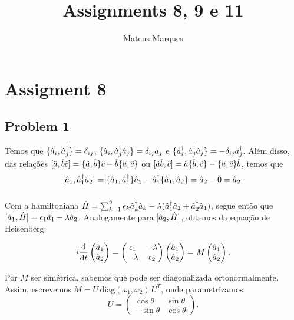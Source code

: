 \documentclass[a4paper,fleqn,12pt]{article}
\title{\Huge{\textbf{Assignments 8, 9 e 11}}}
\author{Mateus Marques}
\begin{document}
\maketitle

\section{Assigment 8}

\subsection{Problem 1}

Temos que $\{ \hat{a}_i, \hat{a}_j^\dagger \} = \delta_{ij}$, $\{\hat{a}_i, \hat{a}_j^\dagger \hat{a}_j \} = \delta_{ij} a_j$ e $\{ \hat{a}_i^\dagger, \hat{a}_j^\dagger \hat{a}_j \} = - \delta_{ij} \hat{a}^\dagger_j$. Além disso, das relações $[\hat{a}, \hat{b} \hat{c}] = \{\hat{a}, \hat{b}\} \hat{c} - \hat{b} \{\hat{a}, \hat{c}\}$ ou $[\hat{a} \hat{b}, \hat{c}] = \hat{a} \{\hat{b}, \hat{c}\} - \{\hat{a}, \hat{c}\} \hat{b}$, temos que
$$
[\hat{a}_1, \hat{a}_1^\dagger \hat{a}_2] = \{\hat{a}_1, \hat{a}_1^\dagger\} \hat{a}_2 - \hat{a}_1^\dagger \{\hat{a}_1, \hat{a}_2\} = \hat{a}_2 - 0 = \hat{a}_2.
$$

\subsubsection{}

Com a hamiltoniana $\hat{H} = \sum_{k=1}^2 \epsilon_k \hat{a}^\dagger_k \hat{a}_k - \lambda(\hat{a}_1^\dagger \hat{a}_2 + \hat{a}_2^\dagger \hat{a}_1)$, segue então que $[\hat{a}_1, \hat{H}] = \epsilon_1 \hat{a}_1 - \lambda \hat{a}_2$. Analogamente para $[\hat{a}_2, \hat{H}]$, obtemos da equação de Heisenberg:
\begin{ceqn} \label{eq:heisenberg1}
\begin{align}
i \dv{t}
\begin{pmatrix}
\hat{a}_1 \\ \hat{a}_2
\end{pmatrix}
=
\begin{pmatrix}
\epsilon_1 & -\lambda \\
-\lambda & \epsilon_2
\end{pmatrix}
\begin{pmatrix}
\hat{a}_1 \\ \hat{a}_2
\end{pmatrix}
=
M
\begin{pmatrix}
\hat{a}_1 \\ \hat{a}_2
\end{pmatrix}.
\end{align}
\end{ceqn}
Por $M$ ser simétrica, sabemos que pode ser diagonalizada ortonormalmente. Assim, escrevemos $M = U \, \text{diag}(\omega_1, \omega_2) \, U^T$, onde parametrizamos
$$
U =
\begin{pmatrix}
\cos\theta & \sin\theta \\
-\sin\theta & \cos\theta
\end{pmatrix}.
$$
\end{document}
